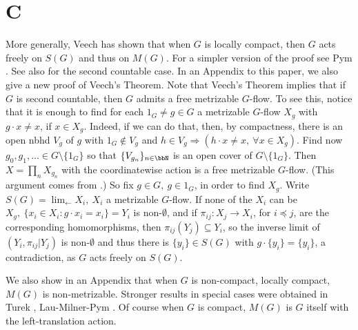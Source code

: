\section{C}
More generally, Veech \cite{V} has shown that when $G$
is locally compact, then
$G$ acts freely on $S(G)$ and thus on $M(G)$.  For a simpler version of
the proof see Pym \cite{Py}.  See also \cite{AS} for the second countable
case.  In an Appendix to this paper, we also give a new proof of Veech's
Theorem.  Note that Veech's Theorem implies that if $G$
is second countable, then $G$
admits a free metrizable $G$-flow.  To see this, notice that it is enough
to find for each $1_G\neq g\in G$ a metrizable $G$-flow $X_g$ with
$g\cdot x\neq x$, if $x\in X_g$.  Indeed, if we can do that, then, by
compactness, there is an open nbhd $V_g$ of $g$ with $1_G\not\in V_g$ and $h\in
    V_g\Rightarrow (h\cdot x\neq x,\ \forall x\in X_g)$.  Find now $g_0,g_1,
    \dots \in G\setminus\{1_G\}$ so that $\{V_{g_n}\}_{n\in\bbN}$ is an open
cover of $G\setminus\{1_G\}$.  Then $X=\prod_nX_{g_n}$ with the
coordinatewise action is a free metrizable $G$-flow. (This argument comes
from \cite{AS}.)
So fix $g\in G,\ g\in 1_G$, in order to find $X_g$.  Write $S(G)=
    \lim_{\leftarrow}X_i,\ X_i$ a metrizable $G$-flow.  If none of the
$X_i$ can be $X_g,\ \{x_i\in X_i:g\cdot x_i=x_i\}=Y_i$ is non-$\emptyset$,
and if $\pi_{ij}:X_j\rightarrow X_i$, for $i\preceq j$, are the
corresponding homomorphisms, then $\pi_{ij}(Y_j)\subseteq Y_i$, so the
inverse limit of $(Y_i,\pi_{ij}|Y_j)$ is non-$\emptyset$ and thus there
is $\{y_i\}\in S(G)$ with $g\cdot \{y_i\}=\{y_i\}$, a contradiction, as $G$
acts freely on $S(G)$.

We also show in an Appendix that when $G$ is non-compact, locally compact,
$M(G)$ is non-metrizable.  Stronger results in
special cases were obtained in Turek \cite{Tu}, Lau-Milner-Pym \cite{LMP}.  Of
course when $G$ is compact, $M(G)$ is $G$ itself with the left-translation
action.
\medskip

